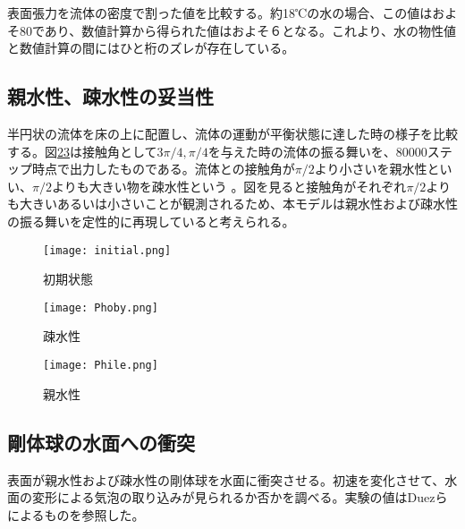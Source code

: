 \documentclass[]{jsarticle}
\begin{document}
表面張力を流体の密度で割った値を比較する。約18℃の水の場合、この値はおよそ80であり、数値計算から得られた値はおよそ６となる。これより、水の物性値と数値計算の間にはひと桁のズレが存在している。


\subsection{親水性、疎水性の妥当性}


半円状の流体を床の上に配置し、流体の運動が平衡状態に達した時の様子を比較する。図\ref{fig:Phoby}\ref{fig:Phile}は接触角として$3\pi/4, \pi/4$を与えた時の流体の振る舞いを、80000ステップ時点で出力したものである。流体との接触角が$\pi/2$より小さいを親水性といい、$\pi/2$よりも大きい物を疎水性という \cite{Truscott2012}。図を見ると接触角がそれぞれ$\pi/2$よりも大きいあるいは小さいことが観測されるため、本モデルは親水性および疎水性の振る舞いを定性的に再現していると考えられる。
\begin{figure}[H]
  \centering
  \texttt{[image: initial.png]}
  \caption{初期状態}
  \label{fig:initial}
\end{figure}
\begin{figure}[H]
    \centering
    \texttt{[image: Phoby.png]}
    \caption{疎水性}
    \label{fig:Phoby}
  \end{figure}
  \begin{figure}[H]
    \centering
    \texttt{[image: Phile.png]}
    \caption{親水性}
    \label{fig:Phile}
\end{figure}

\subsection{剛体球の水面への衝突}
表面が親水性および疎水性の剛体球を水面に衝突させる。初速を変化させて、水面の変形による気泡の取り込みが見られるか否かを調べる。実験の値はDuez\cite{Duez2007}らによるものを参照した。
\end{document}
